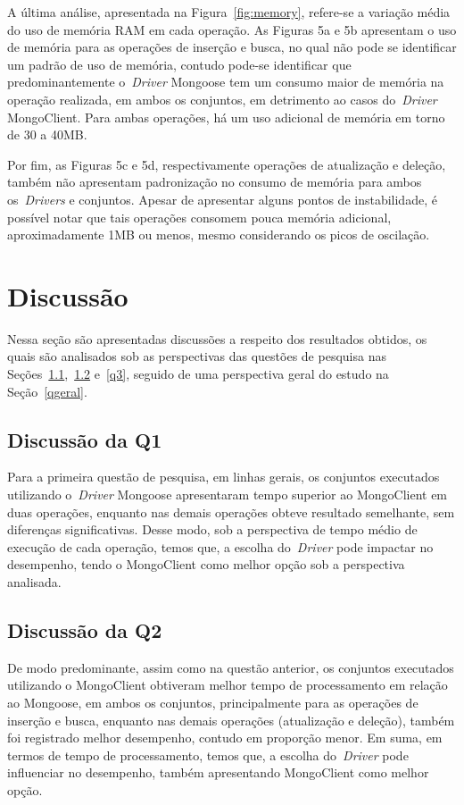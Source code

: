 \documentclass[12pt]{article}
\begin{document}
A última análise, apresentada na Figura~\ref{fig:memory}, refere-se a variação média do uso de memória RAM em cada operação.
As Figuras 5a e 5b apresentam o uso de memória para as operações de inserção e busca, no qual não pode se identificar um padrão de uso de memória, contudo pode-se identificar que predominantemente o~\emph{Driver} Mongoose tem um consumo maior de memória na operação realizada, em ambos os conjuntos, em detrimento ao casos do~\emph{Driver} MongoClient.
Para ambas operações, há um uso adicional de memória em torno de 30 a 40MB.

Por fim, as Figuras 5c e 5d, respectivamente operações de atualização e deleção, também não apresentam padronização no consumo de memória para ambos os~\emph{Drivers} e conjuntos. 
Apesar de apresentar alguns pontos de instabilidade, é possível notar que tais operações consomem pouca memória adicional, aproximadamente 1MB ou menos, mesmo considerando os picos de oscilação.

\section{Discussão}
\label{section:discussao}

Nessa seção são apresentadas discussões a respeito dos resultados obtidos, os quais são analisados sob as perspectivas das questões de pesquisa nas Seções~\ref{q1},~\ref{q2} e~\ref{q3}, seguido de uma perspectiva geral do estudo na Seção~\ref{qgeral}.

\subsection{Discussão da Q1}
\label{q1}

Para a primeira questão de pesquisa, em linhas gerais, os conjuntos executados utilizando o~\emph{Driver} Mongoose apresentaram tempo superior ao MongoClient em duas operações, enquanto nas demais operações obteve resultado semelhante, sem diferenças significativas.
Desse modo, sob a perspectiva de tempo médio de execução de cada operação, temos que, a escolha do~\emph{Driver} pode impactar no desempenho, tendo o MongoClient como melhor opção sob a perspectiva analisada.

\subsection{Discussão da Q2}
\label{q2}

De modo predominante, assim como na questão anterior, os conjuntos executados utilizando o MongoClient obtiveram melhor tempo de processamento em relação ao Mongoose, em ambos os conjuntos, principalmente para as operações de inserção e busca, enquanto nas demais operações (atualização e deleção), também foi registrado melhor desempenho, contudo em proporção menor.
Em suma, em termos de tempo de processamento, temos que, a escolha do~\emph{Driver} pode influenciar no desempenho, também apresentando MongoClient como melhor opção.
\end{document}
